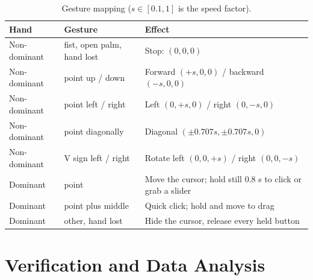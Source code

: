 \documentclass[11pt,a4paper]{article}
\begin{document}
\begin{table}[H]
\caption{Gesture mapping ($s\in[0.1,1]$ is the speed factor).}
\label{tab:gest}
\centering\small
\begin{tabular}{p{2.4cm}p{3.6cm}p{5.6cm}}
\toprule
Hand & Gesture & Effect \\
\midrule
Non-dominant & fist, open palm, hand lost & Stop: $(0,0,0)$ \\
Non-dominant & point up / down & Forward $(+s,0,0)$ / backward $(-s,0,0)$ \\
Non-dominant & point left / right & Left $(0,+s,0)$ / right $(0,-s,0)$ \\
Non-dominant & point diagonally & Diagonal $(\pm0.707s,\pm0.707s,0)$ \\
Non-dominant & V sign left / right & Rotate left $(0,0,+s)$ / right $(0,0,-s)$ \\
Dominant & point & Move the cursor; hold still 0.8 s to click or grab a slider \\
Dominant & point plus middle & Quick click; hold and move to drag \\
Dominant & other, hand lost & Hide the cursor, release every held button \\
\bottomrule
\end{tabular}
\end{table}

\section{Verification and Data Analysis}\label{sec:verify}
\end{document}
